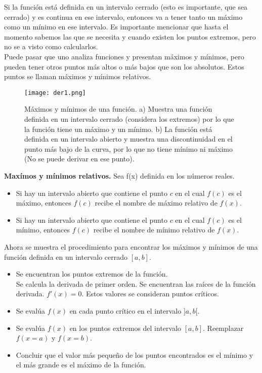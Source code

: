 Si la función está definida en un intervalo cerrado (esto es importante, que sea cerrado) y es continua en ese intervalo, entonces va a tener tanto un máximo como un mínimo en ese intervalo. Es importante mencionar que hasta el momento sabemos las que se necesita y cuando existen los puntos extremos, pero no se a visto como calcularlos.\\

Puede pasar que uno analiza funciones y presentan máximos y mínimos, pero pueden tener otros puntos más altos o más bajos que son los absolutos. Estos puntos se llaman máximos y mínimos relativos.

 \begin{center}
\begin{figure}[h!]
\centering
\texttt{[image: der1.png]}
\caption[Máximos y mínimos de una función.]{Máximos y mínimos de una función. a) Muestra una función definida en un intervalo cerrado (considera los extremos) por lo que la función tiene un máximo y un mínimo. b) La función está definida en un intervalo abierto y muestra una discontinuidad en el punto más bajo de la curva, por lo que no tiene mínimo ni máximo (No se puede derivar en ese punto).} \label{der1}
\end{figure}
\end{center}


\begin{mydef}
\textbf{Maxímos y mínimos relativos. } Sea f(x) definida en los números reales.

\begin{itemize}
\item  Si hay un intervalo abierto que contiene el punto $c$ en el cual $f(c)$ es el máximo, entonces $f(c)$ recibe el nombre de máximo relativo de $f(x)$.
\item Si hay un intervalo abierto que contiene el punto $c$ en el cual $f(c)$ es el mínimo, entonces $f(c)$ recibe el nombre de mínimo relativo de $f(x)$.
\end{itemize}
\end{mydef}

Ahora se muestra el procedimiento para encontrar los máximos y mínimos de una función definida en un intervalo cerrado $[a,b]$.\\
\begin{itemize}
	\item Se encuentran los puntos extremos de la función.\\
		\subitem Se calcula la derivada de primer orden.
		\subitem Se encuentran las raíces de la función derivada. $f'(x)=0$. Estos valores se consideran puntos críticos.
	\item Se evalúa $f(x)$ en cada punto crítico en el intervalo $]a,b[$.
	\item Se evalúa $f(x)$ en los puntos extremos del intervalo $[a,b]$. Reemplazar $f(x=a)$ y $f(x=b)$.
	\item Concluir que el valor más pequeño de los puntos encontrados es el mínimo y el más grande es el máximo de la función.
\end{itemize}

